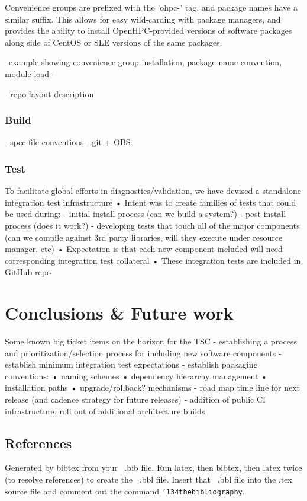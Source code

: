\documentclass{sig-alternate-05-2015}
\begin{document}
Convenience groups are prefixed with the 'ohpc-' tag, and package names have a
similar suffix. This allows for easy wild-carding with package managers, and
provides the ability to install OpenHPC-provided versions of software packages
along side of CentOS or SLE versions of the same packages.

--example showing convenience group installation, package name convention, module
load--

 - repo layout description

\subsubsection{Build}

 - spec file conventions
 - git + OBS
 
\subsubsection{Test}
 To facilitate global efforts in diagnostics/validation, we have devised a standalone integration test infrastructure
 • Intent was to create families of tests that could be used during:
 - initial install process (can we build a system?)
 - post-install process (does it work?)
 - developing tests that touch all of the major components (can we compile against 3rd party libraries, will they execute under resource manager, etc)
 • Expectation is that each new component included will need corresponding integration test collateral
 • These integration tests are included in GitHub repo


\section{Conclusions \& Future work}
Some known big ticket items on the horizon for the TSC
- establishing a process and prioritization/selection process for including
new software components
- establish minimum integration test expectations
- establish packaging conventions:
• naming schemes
• dependency hierarchy management • installation paths
• upgrade/rollback? mechanisms
- road map time line for next release (and cadence strategy for future releases)
- addition of public CI infrastructure, roll out of additional architecture builds






\subsection{References}
Generated by bibtex from your ~.bib file.  Run latex,
then bibtex, then latex twice (to resolve references)
to create the ~.bbl file.  Insert that ~.bbl file into
the .tex source file and comment out
the command \texttt{{\char'134}thebibliography}.
\end{document}
